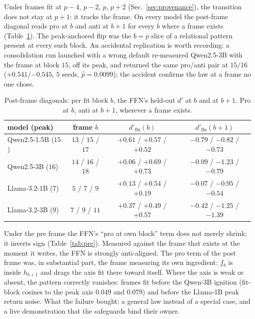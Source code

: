 \documentclass[11pt]{article}
\begin{document}
Under frames fit at $p{-}4$, $p{-}2$, $p$, $p{+}2$
(Sec.~\ref{sec:provenance}), the transition does not stay at $p{+}1$: it
tracks the frame. On every model the post-frame diagonal reads pro at $b$
and anti at $b{+}1$ for every $b$ where a frame exists
(Table~\ref{tab:post}). The peak-anchored flip was the $b{=}p$ slice of a
relational pattern present at every such block. An accidental replication
is worth recording: a consolidation run launched with a wrong default
re-measured Qwen2.5-3B with the frame at block $15$, off its peak, and
returned the same pro/anti pair at $15/16$ ($+0.541$/$-0.545$, $5$ seeds,
$\hat p = 0.0099$); the accident confirms the law at a frame no one chose.

\begin{table}[H]
\centering
\caption{Post-frame diagonals: per fit block $b$, the FFN's held-out $d'$
at $b$ and at $b{+}1$. Pro at $b$, anti at $b{+}1$, wherever a frame
exists.}
\label{tab:post}
\begin{tabular}{lccc}
\toprule
model (peak) & frame $b$ & $d'_{\mathrm{ffn}}(b)$ & $d'_{\mathrm{ffn}}(b{+}1)$ \\
\midrule
Qwen2.5-1.5B ($15$) & $13$ / $15$ / $17$ & $+0.61$ / $+0.57$ / $+0.52$ & $-0.79$ / $-0.82$ / $-0.73$ \\
Qwen2.5-3B ($16$)   & $14$ / $16$ / $18$ & $+0.06$ / $+0.69$ / $+0.73$ & $-0.09$ / $-1.23$ / $-0.79$ \\
Llama-3.2-1B ($7$)  & $5$ / $7$ / $9$    & $+0.13$ / $+0.54$ / $+0.19$ & $-0.07$ / $-0.95$ / $-0.54$ \\
Llama-3.2-3B ($9$)  & $7$ / $9$ / $11$   & $+0.37$ / $+0.49$ / $+0.57$ & $-0.42$ / $-1.25$ / $-1.39$ \\
\bottomrule
\end{tabular}
\end{table}

Under the pre frame the FFN's ``pro at own block'' term does not merely
shrink; it inverts sign (Table~\ref{tab:pre}). Measured against the frame
that exists at the moment it writes, the FFN is strongly anti-aligned. The
pro term of the post frame was, in substantial part, the frame measuring
its own ingredient: $f_b$ is inside $h_{b+1}$ and drags the axis fit there
toward itself. Where the axis is weak or absent, the pattern correctly
vanishes: frames fit before the Qwen-3B ignition (fit-block cosines to the
peak axis $0.049$ and $0.079$) and before the Llama-1B peak return noise.
What the failure bought: a general law instead of a special case, and a
live demonstration that the safeguards bind their owner.
\end{document}
